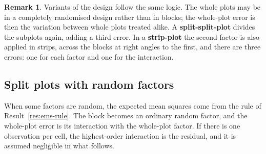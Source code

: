 \documentclass[11pt,a4paper]{article}
\numberwithin{equation}{section}
\theoremstyle{definition}
\newtheorem*{remark}{Remark}
\begin{document}
\begin{remark}
Variants of the design follow the same logic. The whole plots may be in a completely randomised design rather than in blocks; the whole-plot error
is then the variation between whole plots treated alike. A \textbf{split-split-plot} divides the subplots again, adding a third error. In a
\textbf{strip-plot} the second factor is also applied in strips, across the blocks at right angles to the first, and there are three errors: one
for each factor and one for the interaction.
\end{remark}

\subsection{Split plots with random factors}
When some factors are random, the expected mean squares come from the rule of Result~\ref{res:ems-rule}. The block becomes an ordinary random factor,
and the whole-plot error is its interaction with the whole-plot factor. If there is one observation per cell, the highest-order interaction is the
residual, and it is assumed negligible in what follows.
\end{document}
